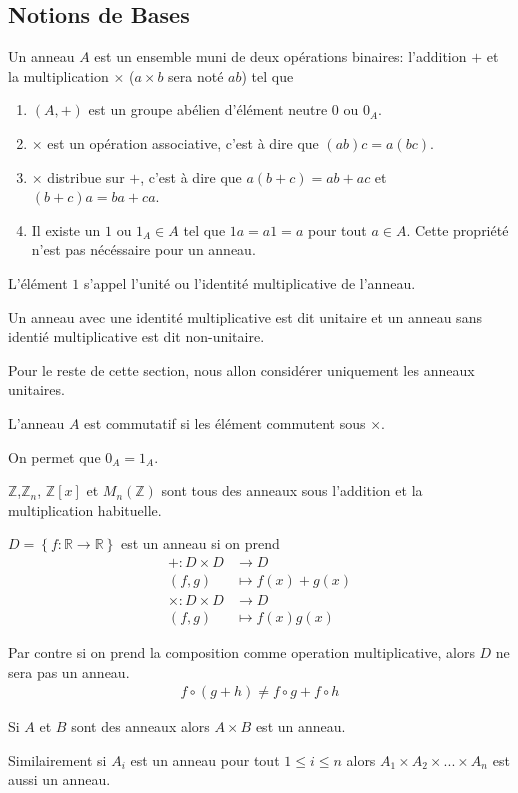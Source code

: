 \subsection{Notions de Bases}
\begin{defn}
\label{def:alg:ring:intro:ring}
Un anneau $A$ est un ensemble muni de deux opérations binaires: l'addition $+$ et la multiplication $\times$ ($a\times b$ sera noté $ab$) tel que
\begin{enumerate}
\item $(A,+)$ est un groupe abélien d'élément neutre $0$ ou $0_A$.
\item $\times$ est un opération associative, c'est à dire que $(ab)c=a(bc)$.
\item $\times$ distribue sur $+$, c'est à dire que $a(b+c)=ab+ac$ et $(b+c)a=ba+ca$.
\item Il existe un $1$ ou $1_A\in A$ tel que $1a=a1=a$ pour tout  $a\in A$. Cette propriété n'est pas nécéssaire pour un anneau.
\end{enumerate}

L'élément $1$ s'appel l'unité ou l'identité multiplicative de l'anneau.

Un anneau avec une identité multiplicative est dit unitaire et un anneau sans identié multiplicative est dit non-unitaire.

Pour le reste de cette section, nous allon considérer uniquement les anneaux unitaires.
\end{defn}

\begin{defn}
\label{def:alg:ring:intro:comut}
L'anneau $A$ est commutatif si les élément commutent sous $\times$. 
\end{defn}

\begin{rmrk}
On permet que $0_A=1_A$.
\end{rmrk}

\begin{ex}
$\mathbb{Z}$,$\mathbb{Z}_n$, $\mathbb{Z}[x]$ et $M_n\left(\mathbb{Z}\right)$ sont tous des anneaux sous l'addition et la multiplication habituelle.

$D=\left\{ f:\mathbb{R}\rightarrow\mathbb{R}\right\}$ est un anneau si on prend
\begin{align*}
+:D\times D&\rightarrow D\\
(f,g)&\mapsto f(x)+g(x)\\
\times:D\times D&\rightarrow D\\
(f,g)&\mapsto f(x)g(x)
\end{align*}

Par contre si on prend la composition comme operation multiplicative, alors $D$ ne sera pas un anneau.
\begin{align*}
f\circ(g+h)\neq f\circ g+f\circ h
\end{align*}

Si $A$ et $B$ sont des anneaux alors $A\times B$ est un anneau.

Similairement si $A_i$ est un anneau pour tout $1\leq i\leq n$ alors $A_1\times A_2\times...\times A_n$ est aussi un anneau.
\end{ex}

